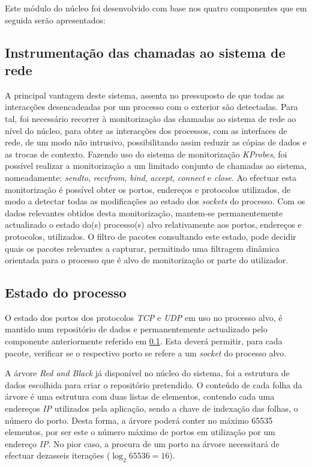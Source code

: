 Este módulo do núcleo foi desenvolvido com base nos quatro componentes que em seguida serão apresentados:


\subsection{Instrumentação das chamadas ao sistema de rede}
\label{sub:mon_syscalls}

A principal vantagem deste sistema, assenta no pressuposto de que todas as interacções desencadeadas por um processo com o exterior são detectadas.
Para tal, foi necessário recorrer à monitorização das chamadas ao sistema de rede ao nível do núcleo, para obter as interacções dos processos, com as interfaces de rede, de um modo não intrusivo, possibilitando assim reduzir as cópias de dados e as trocas de contexto.
Fazendo uso do sistema de monitorização \textit{KProbes}, foi possível realizar a monitorização a um limitado conjunto de chamadas ao sistema, nomeadamente: \textit{sendto}, \textit{recvfrom}, \textit{bind}, \textit{accept}, \textit{connect} e \textit{close}.
Ao efectuar esta monitorização é possível obter os portos, endereços e protocolos utilizados, de modo a detectar todas as modificações ao estado dos \textit{sockets} do processo.
Com os dados relevantes obtidos desta monitorização, mantem-se permanentemente actualizado o estado do(s) processo(s) alvo relativamente aos portos, endereços e protocolos, utilizados.
O filtro de pacotes consultando este estado, pode decidir quais os pacotes relevantes a capturar, permitindo uma filtragem dinâmica orientada para o processo que é alvo de monitorização or parte do utilizador.


\subsection{Estado do processo}
\label{sub:data_repository}

O estado dos portos dos protocolos \textit{TCP} e \textit{UDP} em uso no processo alvo, é mantido num repositório de dados e permanentemente actualizado pelo componente anteriormente referido em \ref{sub:mon_syscalls}.
Esta deverá permitir, para cada pacote, verificar se o respectivo porto se refere a um \textit{socket} do processo alvo.

A árvore \textit{Red and Black} já disponível no núcleo do sistema, foi a estrutura de dados escolhida para criar o repositório pretendido.
O conteúdo de cada folha da árvore é uma estrutura com duas listas de elementos, contendo cada uma endereços \textit{IP} utilizados pela aplicação, sendo a chave de indexação das folhas, o número do porto.
Desta forma, a árvore poderá conter no máximo 65535 elementos, por ser este o número máximo de portos em utilização por um endereço \textit{IP}.
No pior caso, a procura de um porto na árvore necessitará de efectuar dezasseis iterações (\begin{math}\log _2 65536 = 16 \end{math}).

